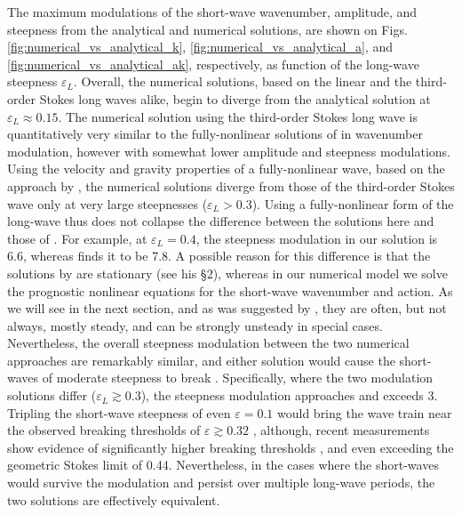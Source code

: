\documentclass[lineno]{jfm}
\begin{document}
The maximum modulations of the short-wave wavenumber, amplitude, and steepness
from the analytical and numerical solutions, are shown on Figs.
\ref{fig:numerical_vs_analytical_k},
\ref{fig:numerical_vs_analytical_a}, and
\ref{fig:numerical_vs_analytical_ak}, respectively, as function of the long-wave
steepness $\varepsilon_L$.
Overall, the numerical solutions, based on the linear and the third-order Stokes
long waves alike, begin to diverge from the analytical solution at
$\varepsilon_L \approx 0.15$.
The numerical solution using the third-order Stokes long wave is quantitatively
very similar to the fully-nonlinear solutions of \citet{longuet1987propagation}
in wavenumber modulation, however with somewhat lower amplitude and steepness
modulations.
Using the velocity and gravity properties of a fully-nonlinear wave, based on
the approach by \citet{clamond2018accurate}, the numerical solutions diverge
from those of the third-order Stokes wave only at very large steepnesses
($\varepsilon_L > 0.3$).
Using a fully-nonlinear form of the long-wave thus does not collapse the
difference between the solutions here and those of \citet{longuet1987propagation}.
For example, at $\varepsilon_L = 0.4$, the steepness modulation in our solution
is 6.6, whereas \citet{longuet1987propagation} finds it to be 7.8.
A possible reason for this difference is that the solutions by
\citet{longuet1987propagation} are stationary (see his \S2), whereas in our
numerical model we solve the prognostic nonlinear equations for the short-wave
wavenumber and action.
As we will see in the next section, and as was suggested by \citet{peureux2021unsteady},
they are often, but not always, mostly steady, and can be strongly unsteady in
special cases.
Nevertheless, the overall steepness modulation between the two numerical
approaches are remarkably similar, and either solution would cause the
short-waves of moderate steepness to break \citep{banner1993wave}.
Specifically, where the two modulation solutions differ ($\varepsilon_L \gtrsim 0.3$),
the steepness modulation approaches and exceeds 3.
Tripling the short-wave steepness of even $\varepsilon = 0.1$ would bring the
wave train near the observed breaking thresholds of $\varepsilon \gtrsim 0.32$
\citep{perlin2013breaking}, although, recent measurements show evidence of
significantly higher breaking thresholds
\citep{toffoli2010maximum,mcallister2024three}, and even exceeding the
geometric Stokes limit of 0.44.
Nevertheless, in the cases where the short-waves would survive the
modulation and persist over multiple long-wave periods, the two solutions are
effectively equivalent.
\end{document}
